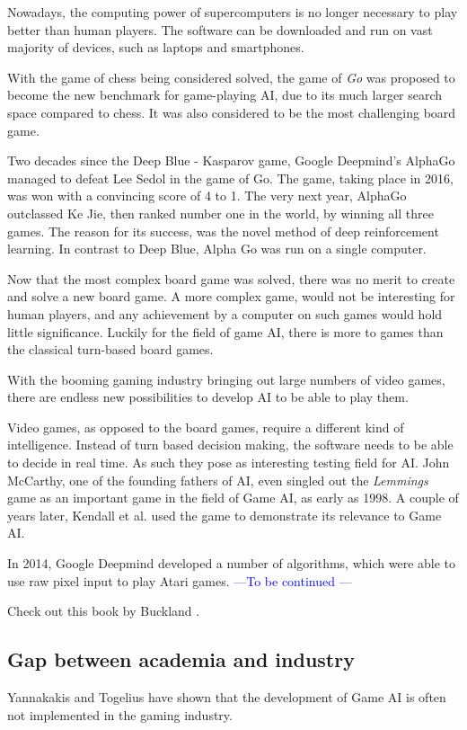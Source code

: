 Nowadays, the computing power of supercomputers is no longer necessary to play better than human players.
The software can be downloaded and run on vast majority of devices, such as laptops and smartphones.

With the game of chess being considered solved, 
the game of \textit{Go} was proposed to become the new benchmark for game-playing AI, 
due to its much larger search space compared to chess.
It was also considered to be the most challenging board game.

Two decades since the Deep Blue - Kasparov game, Google Deepmind's AlphaGo managed to defeat Lee Sedol in the game of Go.
The game, taking place in 2016, was won with a convincing score of 4 to 1.
The very next year, AlphaGo outclassed Ke Jie, then ranked number one in the world, by winning all three games.
The reason for its success, was the novel method of deep reinforcement learning.
In contrast to Deep Blue, Alpha Go was run on a single computer.

Now that the most complex board game was solved, there was no merit to create and solve a new board game.
A more complex game, would not be interesting for human players, and any achievement by a computer on such games would hold little significance.
Luckily for the field of game AI, there is more to games than the classical turn-based board games.

With the booming gaming industry bringing out large numbers of video games, 
there are endless new possibilities to develop AI to be able to play them.

Video games, as opposed to the board games, require a different kind of intelligence.
Instead of turn based decision making, the software needs to be able to decide in real time.
As such they pose as interesting testing field for AI. 
John McCarthy, one of the founding fathers of AI, \cite{mccarthy1998partial} even singled out the \textit{Lemmings} game as an important game in the field of Game AI, 
as early as 1998.
A couple of years later, Kendall et al. \cite{kendall2004scripting} used the game to demonstrate its relevance to Game AI.

In 2014, Google Deepmind developed a number of algorithms, which were able to use raw pixel input to play Atari games.
\textcolor{blue}{---To be continued ---}

Check out this book by Buckland \cite{buckland2005programming}.
% 

\subsection{Gap between academia and industry} \label{subsection:gap}
Yannakakis and Togelius \cite{yannakakis2018artificial} have shown that the development of Game AI is often not implemented in the gaming industry.

